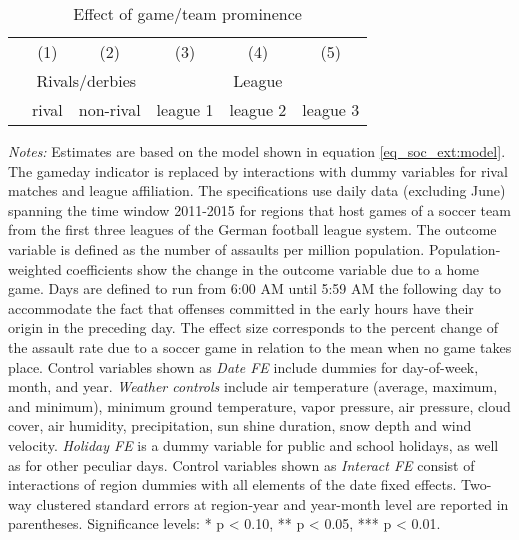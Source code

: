 \documentclass[11pt, a4paper]{article} %
\begin{document}
\vspace*{\fill}
\begin{table}[H] \centering 
	\begin{threeparttable} \centering \caption{Effect of game/team prominence}\label{tab_soc_ext:reg_fe_assrate_prominent_games}
		{\def\sym#1{\ifmmode^{#1}\else\(^{#1}\)\fi} 
			\begin{tabular}{l*{5}{c}}
				\toprule 
				&\multicolumn{1}{c}{(1)}&\multicolumn{1}{c}{(2)}&\multicolumn{1}{c}{(3)}&\multicolumn{1}{c}{(4)}&\multicolumn{1}{c}{(5)}\\
				&\multicolumn{2}{c}{Rivals/derbies} & \multicolumn{3}{c}{League}\\
				\cmidrule(lr){2-3}\cmidrule(lr){4-6}
				& rival & non-rival & league 1 & league 2 & league 3\\
				\midrule
				 
				\bottomrule 
		\end{tabular}}
		\begin{tablenotes} 
			\item \scriptsize \emph{Notes:} Estimates are based on the model shown in equation \ref{eq_soc_ext:model}. The gameday indicator is replaced by interactions with dummy variables for rival matches and league affiliation. The specifications use daily data (excluding June) spanning the time window 2011-2015 for regions that host games of a soccer team from the first three leagues of the German football league system. The outcome variable is defined as the number of assaults per million population. Population-weighted coefficients show the change in the outcome variable due to a home game. Days are defined to run from 6:00 AM until 5:59 AM the following day to accommodate the fact that offenses committed in the early hours have their origin in the preceding day. The effect size corresponds to the percent change of the assault rate due to a soccer game in relation to the mean when no game takes place. Control variables shown as \textit{Date FE} include dummies for day-of-week, month, and year. \textit{Weather controls} include air temperature (average, maximum, and minimum), minimum ground temperature, vapor pressure, air pressure, cloud cover, air humidity, precipitation, sun shine duration, snow depth and wind velocity. \textit{Holiday FE} is a dummy variable for public and school holidays, as well as for other peculiar days. Control variables shown as \textit{Interact FE} consist of interactions of region dummies with all elements of the date fixed effects. Two-way clustered standard errors at region-year and year-month level are reported in parentheses. \newline Significance levels: * p < 0.10, ** p < 0.05, *** p < 0.01.
		\end{tablenotes} 
	\end{threeparttable} 
\end{table}
\end{document}
